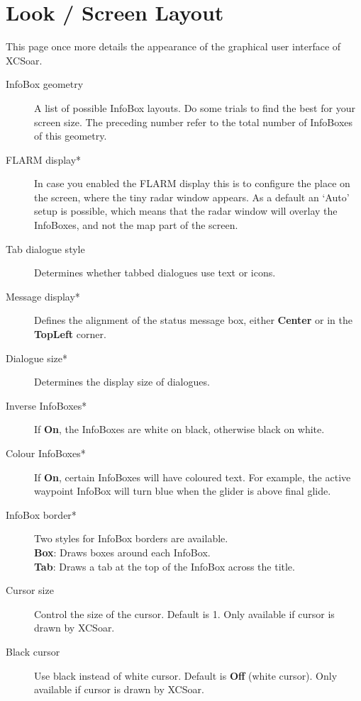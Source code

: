 \section{Look / Screen Layout}\label{sec:interface-appearance}
\label{conf:interface-appearance}

This page once more details the appearance of the graphical user interface of XCSoar.

\begin{description}
\item[InfoBox geometry]  A list of possible InfoBox layouts. Do some trials to find the 
  best for your screen size. The preceding number refer to the total number of 
  InfoBoxes of this geometry.
\item[FLARM display*]  \label{conf:flarmradar-place}
  In case you enabled the FLARM display this is to configure the
  place on the screen, where the tiny radar window appears. As a default an `Auto' setup 
  is possible, which means that the radar window will overlay the InfoBoxes, and not the map
  part of the screen.
\item[Tab dialogue style]  Determines whether tabbed dialogues use text or icons.
\item[Message display*]  Defines the alignment of the status message box, either 
  {\bf Center} or in the {\bf TopLeft} corner.
\item[Dialogue size*]  Determines the display size of dialogues.
\item[Inverse InfoBoxes*]  If {\bf On}, the InfoBoxes are white on black, otherwise 
  black on white.
\item[Colour InfoBoxes*]  If {\bf On}, certain InfoBoxes will have coloured text. For 
  example, the active waypoint InfoBox will turn blue when the glider is above final 
  glide.
\item[InfoBox border*]  Two styles for InfoBox borders are available. \\
  {\bf Box}: Draws boxes around each InfoBox. \\
  {\bf Tab}: Draws a tab at the top of the InfoBox across the 
  title. \\
\item[Cursor size]  Control the size of the cursor. Default is 1.
  Only available if cursor is drawn by XCSoar.
\item[Black cursor] Use black instead of white cursor. Default is {\bf Off} (white cursor).
  Only available if cursor is drawn by XCSoar.
\end{description}


